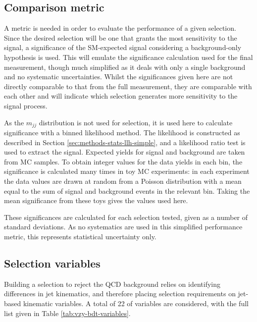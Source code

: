 \subsection{Comparison metric}
\label{sec:vzy-bdt-significance}

A metric is needed in order to evaluate the performance of a given selection.
Since the desired selection will be one that grants the most sensitivity to the
\VZy signal, a significance of the \ac{SM}-expected signal considering a background-only
hypothesis is used. This will emulate the significance calculation used for the
final measurement, though much simplified as it deals with only a single
background and no systematic uncertainties. Whilst the significances given here
are not directly comparable to that from the full measurement, they are comparable with
each other and will indicate which selection generates more sensitivity to the
signal process.

As the $m_{jj}$ distribution is not used for selection, it is used here to
calculate significance with a binned likelihood method.
The likelihood is
constructed as described in Section \ref{sec:methods-stats-llh-simple}, and a
likelihood ratio test is used to extract the signal. Expected yields for signal
and background are taken from \ac{MC} samples.
To obtain integer values for the data yields in each bin, the significance is
calculated many times in toy \ac{MC} experiments: in each experiment the data
values are drawn at random from a Poisson distribution with a mean equal to the
sum of signal and background events in the relevant bin. Taking the mean
significance from these toys gives the values used here.

These significances are calculated for each selection tested, given as a number
of standard deviations. As no systematics are used in this simplified
performance metric, this represents statistical uncertainty only.

\subsection{Selection variables}

Building a selection to reject the \ac{QCD} \Zy background relies on identifying
differences in jet kinematics, and therefore placing selection requirements on
jet-based kinematic variables. A total of 22 of variables are considered, with
the full list given in Table \ref{tab:vzy-bdt-variables}.

